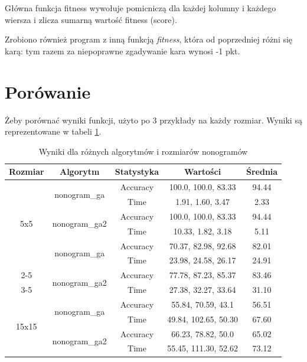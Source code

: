 \documentclass[12pt,a4paper]{article}
\begin{document}
Główna funkcja fitness wywołuje pomicniczą dla każdej kolumny i każdego wiersza i zlicza sumarną wartość fitness (score).

Zrobiono również program z inną funkcją \textit{fitness}, która od poprzedniej różni się karą: tym razem za niepoprawne zgadywanie kara wynosi -1 pkt.

\newpage
\section{Porówanie}

Żeby porównać wyniki funkcji, użyto po 3 przykłady na każdy rozmiar. Wyniki są reprezentowane w tabeli \ref{tab:nonogram_results}.

\begin{table}[h]
    \centering
    \begin{tabular}{|c|c|c|c|c|}
        \hline
        Rozmiar & Algorytm & Statystyka & Wartości & Średnia \\ \hline
        \multirow{6}{*}{5x5} 
        & \multirow{2}{*}{nonogram\_ga} & Accuracy & 100.0, 100.0, 83.33 & 94.44 \\ \cline{3-5}
        & & Time & 1.91, 1.60, 3.47 & 2.33 \\ \cline{2-5}
        & \multirow{2}{*}{nonogram\_ga2} & Accuracy & 100.0, 100.0, 83.33 & 94.44 \\ \cline{3-5}
        & & Time & 10.33, 1.82, 3.18 & 5.11 \\ \hline
        \multirow{6}{*}{10x10} 
        & \multirow{2}{*}{nonogram\_ga} & Accuracy & 70.37, 82.98, 92.68 & 82.01 \\ \cline{3-5}
        & & Time & 23.98, 24.58, 26.17 & 24.91 \\ \cline{2-5}
        & \multirow{2}{*}{nonogram\_ga2} & Accuracy & 77.78, 87.23, 85.37 & 83.46 \\ \cline{3-5}
        & & Time & 27.38, 32.27, 33.64 & 31.10 \\ \hline
        \multirow{6}{*}{15x15} 
        & \multirow{2}{*}{nonogram\_ga} & Accuracy & 55.84, 70.59, 43.1 & 56.51 \\ \cline{3-5}
        & & Time & 49.84, 102.65, 50.30 & 67.60 \\ \cline{2-5}
        & \multirow{2}{*}{nonogram\_ga2} & Accuracy & 66.23, 78.82, 50.0 & 65.02 \\ \cline{3-5}
        & & Time & 55.45, 111.30, 52.62 & 73.12 \\ \hline
    \end{tabular}
    \caption{Wyniki dla różnych algorytmów i rozmiarów nonogramów}
    \label{tab:nonogram_results}
\end{table}
\end{document}
